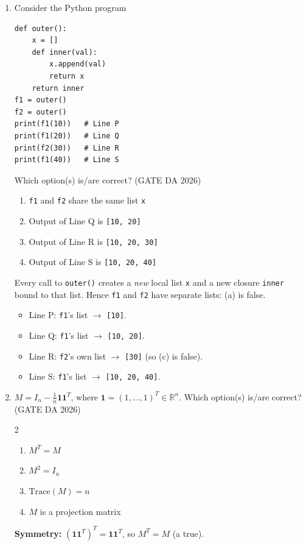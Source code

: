\begin{enumerate}[label=\textbf{Q.\arabic*},leftmargin=*,start=1]
\item[\textbf{Q.50}] Consider the Python program
\begin{lstlisting}
def outer():
    x = []
    def inner(val):
        x.append(val)
        return x
    return inner
f1 = outer()
f2 = outer()
print(f1(10))   # Line P
print(f1(20))   # Line Q
print(f2(30))   # Line R
print(f1(40))   # Line S
\end{lstlisting}
Which option(s) is/are correct?
\hfill (GATE DA 2026)
\begin{enumerate}[label=(\alph*),itemsep=0pt]
 \item \texttt{f1} and \texttt{f2} share the same list \texttt{x}
 \item Output of Line Q is \texttt{[10, 20]}
 \item Output of Line R is \texttt{[10, 20, 30]}
 \item Output of Line S is \texttt{[10, 20, 40]}
\end{enumerate}
\solution
Every call to \texttt{outer()} creates a \emph{new} local list \texttt{x} and a new closure
\texttt{inner} bound to that list. Hence \texttt{f1} and \texttt{f2} have separate lists: (a) is false.
\begin{itemize}
 \item Line P: \texttt{f1}'s list $\to$ \texttt{[10]}.
 \item Line Q: \texttt{f1}'s list $\to$ \texttt{[10, 20]}.
 \item Line R: \texttt{f2}'s own list $\to$ \texttt{[30]} (so (c) is false).
 \item Line S: \texttt{f1}'s list $\to$ \texttt{[10, 20, 40]}.
\end{itemize}

\item[\textbf{Q.52}] $M=I_n-\frac1n\mathbf{1}\mathbf{1}^T$, where
$\mathbf 1=(1,\dots,1)^T\in\mathbb R^n$. Which option(s) is/are correct?
\hfill (GATE DA 2026)
\begin{multicols}{2}
\begin{enumerate}[label=(\alph*),itemsep=0pt]
 \item $M^T=M$ \item $M^2=I_n$ \item $\mathrm{Trace}(M)=n$ \item $M$ is a projection matrix
\end{enumerate}
\end{multicols}
\solution
\textbf{Symmetry:} $(\mathbf{1}\mathbf{1}^T)^T=\mathbf{1}\mathbf{1}^T$, so $M^T=M$ (a true).


\end{enumerate}
